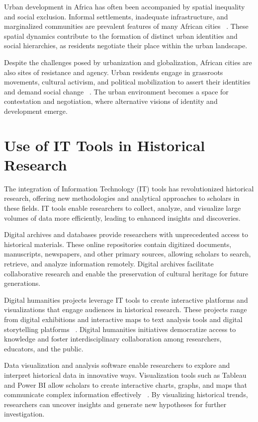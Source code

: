 Urban development in Africa has often been accompanied by spatial inequality and social exclusion. Informal settlements, inadequate infrastructure, and marginalized communities are prevalent features of many African cities ~\cite{falola2008history}. These spatial dynamics contribute to the formation of distinct urban identities and social hierarchies, as residents negotiate their place within the urban landscape.

Despite the challenges posed by urbanization and globalization, African cities are also sites of resistance and agency. Urban residents engage in grassroots movements, cultural activism, and political mobilization to assert their identities and demand social change ~\cite{Onilude}. The urban environment becomes a space for contestation and negotiation, where alternative visions of identity and development emerge.

\section{Use of IT Tools in Historical Research}
The integration of Information Technology (IT) tools has revolutionized historical research, offering new methodologies and analytical approaches to scholars in these fields. IT tools enable researchers to collect, analyze, and visualize large volumes of data more efficiently, leading to enhanced insights and discoveries.

Digital archives and databases provide researchers with unprecedented access to historical materials. These online repositories contain digitized documents, manuscripts, newspapers, and other primary sources, allowing scholars to search, retrieve, and analyze information remotely. Digital archives facilitate collaborative research and enable the preservation of cultural heritage for future generations.

Digital humanities projects leverage IT tools to create interactive platforms and visualizations that engage audiences in historical research. These projects range from digital exhibitions and interactive maps to text analysis tools and digital storytelling platforms ~\cite{Bolstad}. Digital humanities initiatives democratize access to knowledge and foster interdisciplinary collaboration among researchers, educators, and the public.

Data visualization and analysis software enable researchers to explore and interpret historical data in innovative ways. Visualization tools such as Tableau and Power BI allow scholars to create interactive charts, graphs, and maps that communicate complex information effectively ~\cite{Few}. By visualizing historical trends, researchers can uncover insights and generate new hypotheses for further investigation.
